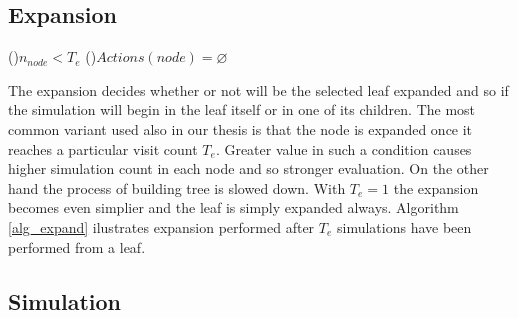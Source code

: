 \subsection{Expansion}
\label{sec_expansion}


\begin{algorithm}
\DontPrintSemicolon
\caption{$Expand(node)$\label{alg_expand}}
\If(){$n_{node} < T_e$}{
}
\If(){$Actions(node) = \varnothing$}{
}
\end{algorithm}

The expansion decides whether or not will be the selected leaf expanded and so if the simulation
will begin in the leaf itself or in one of its children. The most common variant used also in our
thesis is that the node is
expanded once it reaches a particular visit count $T_e$. Greater value in such a condition causes higher
simulation count in each node and so stronger evaluation. On the other hand the process of building
tree is slowed down. With $T_e=1$ the expansion becomes even simplier and the leaf is simply
expanded always. Algorithm \ref{alg_expand} ilustrates expansion performed after $T_e$
simulations have been performed from a leaf.


\subsection{Simulation}
\label{sec_simulation}

\begin{algorithm}
\DontPrintSemicolon
\caption{$Playouts(node)$\label{alg_playouts}}
\end{algorithm}

